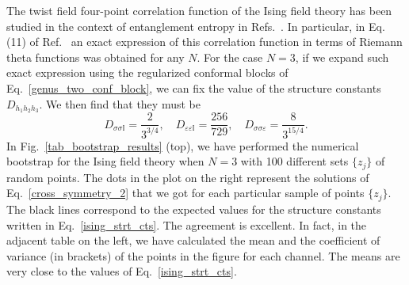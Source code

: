 \documentclass[a4paper,11pt]{article}
\begin{document}
The twist field four-point correlation function of the Ising field theory
has been studied in the context of entanglement entropy in Refs.~\cite{Calabrese, Rajabpour, Ruggiero}. 
In particular, in Eq. (11) of Ref.~\cite{Calabrese} an exact expression of 
this correlation function in terms of Riemann theta functions was obtained for any $N$.
For the case $N=3$, if we expand such exact expression using the regularized conformal 
blocks of Eq.~\eqref{genus_two_conf_block}, we can fix the value of the 
structure constants $D_{h_1h_2h_3}$. We then find that they must be
\begin{equation}\label{ising_strt_cts}
 D_{\sigma\sigma\mathbb{I}}=\frac{2}{3^{3/4}},\quad D_{\varepsilon\varepsilon\mathbb{I}}=\frac{256}{729},
 \quad D_{\sigma\sigma\varepsilon}=\frac{8}{3^{15/4}}.
\end{equation}
In Fig.~\ref{tab_bootstrap_results} (top), we have performed the numerical bootstrap for the 
Ising field theory when $N=3$ with 100 different sets $\{z_j\}$ of 
random points. The dots in the plot on the right represent the solutions 
of Eq.~\eqref{cross_symmetry_2} that we got for each particular sample of 
points $\{z_j\}$. The black lines correspond to the expected values for 
the structure constants written in Eq.~\eqref{ising_strt_cts}. The 
agreement is excellent. In fact, in the adjacent table on the left, we have calculated the 
mean and the coefficient of variance (in brackets) of the points in the figure 
for each channel. The means are very close to the values of Eq.~\eqref{ising_strt_cts}.
\end{document}
